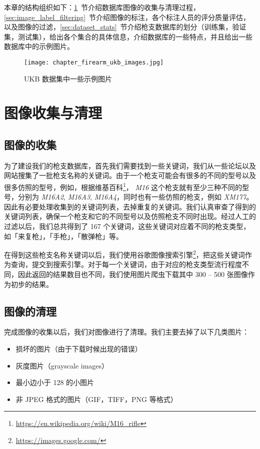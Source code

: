 本章的结构组织如下：\ref{sec:image_collect_clean}~节介绍数据库图像的收集与清理过程，\ref{sec:image_label_filtering}~节介绍图像的标注，各个标注人员的评分质量评估，以及图像的过滤，\ref{sec:dataset_stats}~节介绍枪支数据库的划分（训练集，验证集，测试集），给出各个集合的具体信息，介绍数据库的一些特点，并且给出一些数据库中的示例图片。

\begin{figure}[!t]
	\centering
	\texttt{[image: chapter\_firearm\_ukb\_images.jpg]}
	\caption{UKB 数据集中一些示例图片}
	\label{fig:ukb_images}
\end{figure}

\section{图像收集与清理}\label{sec:image_collect_clean}
\subsection{图像的收集}
为了建设我们的枪支数据库，首先我们需要找到一些关键词，我们从一些论坛以及网站搜集了一批枪支名称的关键词。由于一个枪支可能会有很多的不同的型号以及很多仿照的型号，例如，根据维基百科\footnote{\url{https://en.wikipedia.org/wiki/M16_rifle}}， \emph{M16} 这个枪支就有至少三种不同的型号，分别为 \emph{M16A2}, \emph{M16A3}, \emph{M16A4}，同时也有一些仿照的枪支，例如 \emph{XM177}。因此有必要处理收集到的关键词列表，去掉重复的关键词。我们认真审查了得到的关键词列表，确保一个枪支和它的不同型号以及仿照枪支不同时出现。经过人工的过滤以后，我们总共得到了 167 个关键词，这些关键词对应着不同的枪支类型，如「来复枪」，「手枪」，「散弹枪」等。

在得到这些枪支名称关键词以后，我们使用谷歌图像搜索引擎\footnote{\url{https://images.google.com/}}，把这些关键词作为查询，提交到搜索引擎。对于每一个关键词，由于对应的枪支类型流行程度不同，因此返回的结果数目也不同，我们使用图片爬虫下载其中 300 -- 500 张图像作为初步的结果。

\subsection{图像的清理}
完成图像的收集以后，我们对图像进行了清理。我们主要去掉了以下几类图片：
\begin{itemize}
\item 损坏的图片（由于下载时候出现的错误）
\item 灰度图片（grayscale images）
\item 最小边小于 128 的小图片
\item 非 JPEG 格式的图片（GIF，TIFF，PNG 等格式）
\end{itemize}

